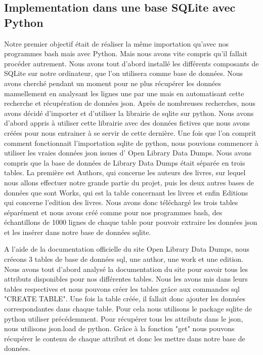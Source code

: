 \documentclass[12pt, a4paper]{article}
\begin{document}
\subsection{Implementation dans une base SQLite avec Python}
Notre premier objectif était de réaliser la même importation qu'avec nos programmes bash mais avec Python. Mais nous avons vite compris qu'il fallait procéder autrement. Nous avons tout d'abord installé les différents composants de SQLite sur notre ordinateur, que l'on utilisera comme base de données. Nous avons cherché pendant un moment pour ne plus récupérer les données manuellement en analysant les lignes une par une mais en automatisant cette recherche  et récupération de données json. Après de nombreuses recherches, nous avons décidé d'importer et d'utiliser la librairie de sqlite sur python. Nous avons d'abord appris à utiliser cette librairie avec des données fictives que nous avons créées pour nous entrainer à se servir de cette dernière. Une fois que l'on comprit comment fonctionnait l'importation sqlite de python, nous pouvions commencer à utiliser les vraies données json issues d' Open Library Data Dumps. Nous avons compris que la base de données de Library Data Dumps était séparée en trois tables. La première est Authors, qui concerne les auteurs des livres, sur lequel nous allons effectuer notre grande partie du projet, puis les deux autres bases de données que sont Works, qui est la table concernant les livres et enfin Editions qui concerne l'edition des livres. Nous avons donc téléchargé les trois tables séparément et nous avons créé comme pour nos programmes bash, des échantillons de 1000 lignes de chaque table pour pouvoir extraire les données json et les insérer dans notre base de données sqlite.

A l'aide de la documentation officielle du site Open Library Data Dumps, nous créeons 3 tables de base de données sql, une author, une work et une edition. Nous avons tout d'abord analysé la documentation du site pour savoir tous les attributs disponibles pour nos différentes tables. Nous les avons mis dans leurs tables respectives et nous pouvons créer les tables grâce aux commandes sql "CREATE TABLE". Une fois la table créée, il fallait donc ajouter les données correspondantes dans chaque table. Pour cela nous utilisons le package sqlite de python utiliser précédemment. Pour récupérer tous les attributs dans le json, nous utilisons json.load de python. Grâce à la fonction "get" nous pouvons récupérer le contenu de chaque attribut et donc les mettre dans notre base de données. 
\end{document}
